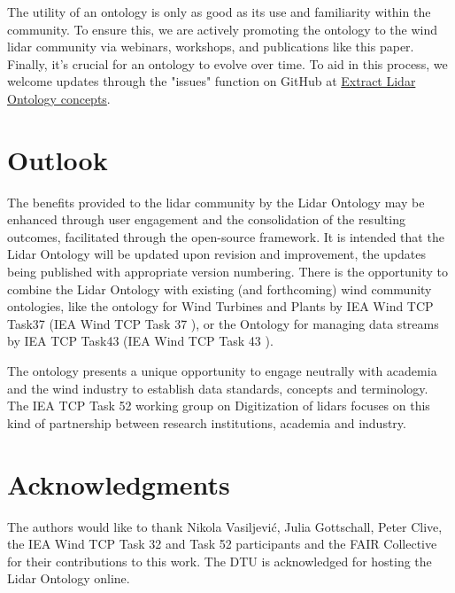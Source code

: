 \documentclass[remotesensing,article,submit,pdftex,moreauthors]{Definitions/mdpi}
\begin{document}
The utility of an ontology is only as good as its use and familiarity within the community. To ensure this, we are actively promoting the ontology to the wind lidar community via webinars, workshops, and publications like this paper.
Finally, it's crucial for an ontology to evolve over time. To aid in this process, we welcome updates through the "issues" function on GitHub at \href{https://github.com/IEAWindTask52/Extract-lidar-ontology-concepts/issues}{Extract Lidar Ontology concepts}.


\section{Outlook}
\label{sec:Outlook}
The benefits provided to the lidar community by the Lidar Ontology may be enhanced through user engagement and the consolidation of the resulting outcomes, facilitated through the open-source framework.
It is intended that the Lidar Ontology will be updated upon revision and improvement, the updates being published with appropriate version numbering. There is the opportunity to combine the Lidar Ontology with existing (and forthcoming) wind community ontologies, like the ontology  for Wind Turbines and Plants by IEA Wind TCP Task37 (IEA Wind TCP Task 37 \cite{Task37_web}), or the Ontology for managing data streams by IEA TCP Task43 (IEA Wind TCP Task 43 \cite{Task43_web}).


The ontology presents a unique opportunity to engage neutrally with academia and the wind industry to establish data standards, concepts and terminology. The IEA TCP Task 52 working group on Digitization of lidars focuses on this kind of partnership between  research institutions, academia and industry.


\section{Acknowledgments}
The authors would like to thank Nikola Vasiljevi\'{c}, Julia Gottschall, Peter Clive, the IEA Wind TCP Task 32 and Task 52 participants and the FAIR Collective for their contributions to this work.
The DTU is acknowledged for hosting the Lidar Ontology online.
\end{document}
